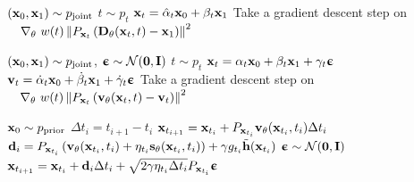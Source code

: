 \algrenewcommand\algorithmicindent{0.5em}
\noindent 
\begin{minipage}[t]{0.495\textwidth}
\begin{algorithm}[H]
\caption{Training for $p_{\text{prior}}=\clN(0,\bfI)$} 
\label{alg:training} 
\small
\vspace{0.05in}
\begin{algorithmic}[1]
\Repeat
  \State $(\mathbf{x}_0,\mathbf{x}_1) \sim p_{\mathrm{joint}}$
  \State $t \sim p_t$
  \State $\mathbf{x}_t = \hat{\alpha}_t \mathbf{x}_0 + \beta_t \mathbf{x}_1$
  \State Take a gradient descent step on
  \Statex $\quad \nabla_\theta ~ w(t) \left\| P_{\mathbf{x}_t} \left( \mathbf{D}_\theta(\mathbf{x}_t,t) - \mathbf{x}_1 \right) \right\|^2$
\end{algorithmic}
\vspace{0.05in}
\end{algorithm}
\end{minipage}
\hfill
\begin{minipage}[t]{0.495\textwidth}
\begin{algorithm}[H]
\caption{Training for general $p_{\text{prior}}$} 
\label{alg:training-appx} 
\small
\vspace{0.05in}
\begin{algorithmic}[1]
\Repeat
  \State $(\mathbf{x}_0,\mathbf{x}_1) \sim p_{\mathrm{joint}}$, ${\bm{\upepsilon}} \sim \mathcal{N}(\mathbf{0},\mathbf{I})$
  \State $t \sim p_t$ 
  \State $\mathbf{x}_t = \alpha_t \mathbf{x}_0 + \beta_t \mathbf{x}_1 + \gamma_t {\bm{\upepsilon}}$
  \State $\mathbf{v}_t = \dot{\alpha}_t \mathbf{x}_0 + \dot{\beta}_t \mathbf{x}_1 + \dot{\gamma}_t {\bm{\upepsilon}}$
  \State Take a gradient descent step on
  \Statex $\quad \nabla_\theta ~ w(t) \left\| P_{\mathbf{x}_t} \left( \mathbf{v}_\theta(\mathbf{x}_t,t) - \mathbf{v}_t \right) \right\|^2$
\end{algorithmic}
\vspace{0.05in}
\end{algorithm}
\end{minipage}

\begin{algorithm}[H]
\caption{Sampling} 
\label{alg:sampling-appx} 
\small
\begin{algorithmic}[1]
\State $\mathbf{x}_0 \sim p_{\text{prior}}$
  \State $\Delta t_i = t_{i+1} - t_i$
    \State $\mathbf{x}_{t_{i+1}} = \mathbf{x}_{t_i} + P_{\mathbf{x}_{t_i}} \mathbf{v}_\theta(\mathbf{x}_{t_i}, t_i) \Delta t_i$
  \EndIf
    \State $\mathbf{d}_i = P_{\mathbf{x}_{t_i}} \left( \mathbf{v}_\theta(\mathbf{x}_{t_i}, t_i) + \eta_{t_i} \mathbf{s}_\theta(\mathbf{x}_{t_i}, t_i) \right) + \gamma g_{t_i} \tilde{\mathbf{h}}(\mathbf{x}_{t_i})$
    \State ${\bm{\upepsilon}} \sim \mathcal{N}(\mathbf{0},\mathbf{I})$
    \State $\mathbf{x}_{t_{i+1}} = \mathbf{x}_{t_i} + \mathbf{d}_i \Delta t_i + \sqrt{2\gamma \eta_{t_i} \Delta t_i} P_{\mathbf{x}_{t_i}} {\bm{\upepsilon}}$
  \EndIf
\EndFor
\end{algorithmic}
\end{algorithm}
